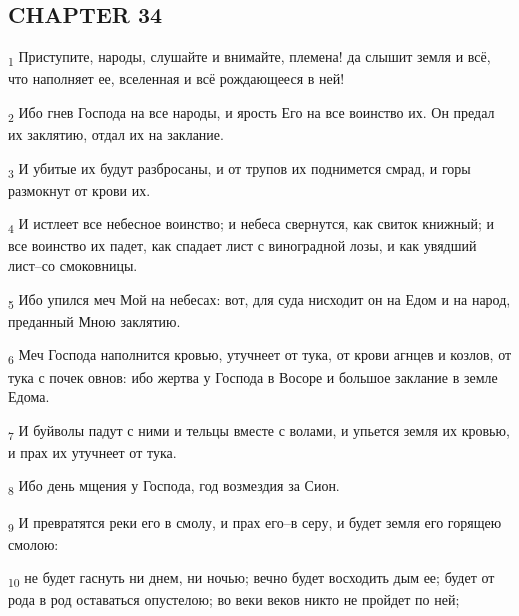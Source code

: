 \subsection{CHAPTER 34}
\begin{tcolorbox}
\textsubscript{1} Приступите, народы, слушайте и внимайте, племена! да слышит земля и всё, что наполняет ее, вселенная и всё рождающееся в ней!
\end{tcolorbox}
\begin{tcolorbox}
\textsubscript{2} Ибо гнев Господа на все народы, и ярость Его на все воинство их. Он предал их заклятию, отдал их на заклание.
\end{tcolorbox}
\begin{tcolorbox}
\textsubscript{3} И убитые их будут разбросаны, и от трупов их поднимется смрад, и горы размокнут от крови их.
\end{tcolorbox}
\begin{tcolorbox}
\textsubscript{4} И истлеет все небесное воинство; и небеса свернутся, как свиток книжный; и все воинство их падет, как спадает лист с виноградной лозы, и как увядший лист--со смоковницы.
\end{tcolorbox}
\begin{tcolorbox}
\textsubscript{5} Ибо упился меч Мой на небесах: вот, для суда нисходит он на Едом и на народ, преданный Мною заклятию.
\end{tcolorbox}
\begin{tcolorbox}
\textsubscript{6} Меч Господа наполнится кровью, утучнеет от тука, от крови агнцев и козлов, от тука с почек овнов: ибо жертва у Господа в Восоре и большое заклание в земле Едома.
\end{tcolorbox}
\begin{tcolorbox}
\textsubscript{7} И буйволы падут с ними и тельцы вместе с волами, и упьется земля их кровью, и прах их утучнеет от тука.
\end{tcolorbox}
\begin{tcolorbox}
\textsubscript{8} Ибо день мщения у Господа, год возмездия за Сион.
\end{tcolorbox}
\begin{tcolorbox}
\textsubscript{9} И превратятся реки его в смолу, и прах его--в серу, и будет земля его горящею смолою:
\end{tcolorbox}
\begin{tcolorbox}
\textsubscript{10} не будет гаснуть ни днем, ни ночью; вечно будет восходить дым ее; будет от рода в род оставаться опустелою; во веки веков никто не пройдет по ней;
\end{tcolorbox}
